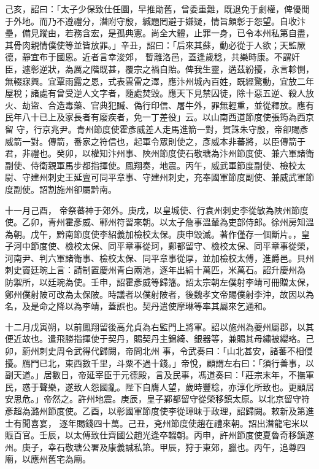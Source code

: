 \begin{pinyinscope}
 己亥，詔曰：「太子少保致仕任圜，早推勛舊，曾委重難，既退免于劇權，俾優閒于外地。而乃不遵禮分，潛附守殷，緘題罔避于嫌疑，情旨頗彰于怨望。自收汴壘，備見蹤由，若務含宏，是孤典憲。尚全大體，止罪一身，已令本州私第自盡，其骨肉親情僕使等並皆放罪。」辛丑，詔曰：「后來其蘇，動必從于人欲；天監厥德，靜宜布于國恩。近者言幸浚郊，
 暫離洛邑，蓋逢歲稔，共樂時康。不謂奸臣，遽彰逆狀，為厲之階既甚，覆宗之禍自貽。俾我生靈，遘茲紛擾，永言軫惻，無輟寐興。宜覃雨露之恩，式表雲雷之澤，應汴州城內百姓，既經驚動，宜放二年屋稅；諸處有曾受逆人文字者，隨處焚毀。應天下見禁囚徒，除十惡五逆、殺人放火、劫盜、合造毒藥、官典犯贓、偽行印信、屠牛外，罪無輕重，並從釋放。應有民年八十已上及家長者有廢疾者，免一丁差役」云。以山南西道節度使張筠為西京留
 守，行京兆尹。青州節度使霍彥威差人走馬進箭一對，賀誅朱守殷，帝卻賜彥威箭一對。傳箭，番家之符信也，起軍令眾則使之，彥威本非蕃將，以臣傳箭于君，非禮也。癸卯，以權知汴州事、陜州節度使石敬瑭為汴州節度使、兼六軍諸衛副使、侍衛親軍馬步都指揮使。鳳翔奏，地震。丙午，威武軍節度副使、檢校太尉、守建州刺史王延亶可同平章事、守建州刺史，充奉國軍節度副使、兼威武軍節度副使。詔割施州卻屬黔南。



 十一月己酉，
 帝祭蕃神于郊外。庚戌，以皇城使、行袁州刺史李從敏為陜州節度使。乙卯，青州霍彥威、鄆州符習來朝。以太子詹事溫輦為吏部侍郎。徐州房知溫為朝。戊午，黔南節度使李紹義加檢校太保。庚申毀滅。著作僅存一個斷片。，皇子河中節度使、檢校太保、同平章事從珂，鄴都留守、檢校太保、同平章事從榮，河南尹、判六軍諸衛事、檢校太保、同平章事從厚，並加檢校太傅，進爵邑。貝州刺史竇廷琬上言：請制置慶州青白兩池，逐年出絹十萬匹，米萬石。詔升慶州為
 防禦所，以廷琬為使。壬申，詔霍彥威等歸籓。詔太宗朝左僕射李靖可冊贈太保，鄭州僕射陂可改為太保陂。時議者以僕射陂者，後魏孝文帝賜僕射李沖，故因以為名，及是命之降以為李靖，蓋誤也。契丹遣使摩琳等率其屬來乞通和。



 十二月戊寅朔，以前鳳翔留後高允貞為右監門上將軍。詔以施州為夔州屬郡，以其便近故也。遣飛勝指揮使于契丹，賜契丹主錦綺、銀器等，兼賜其母繡被纓珞。己卯，蔚州刺史周令武得代歸闕，帝問北州
 事，令武奏曰：「山北甚安，諸蕃不相侵擾。鴈門已北，東西數千里，斗粟不過十錢。」帝悅，顧謂左右曰：「須行善事，以副天道。」居數日，帝延宰臣于元德殿，言及民事，馮道奏曰：「莊宗末年，不撫軍民，惑于聲樂，遂致人怨國亂。陛下自膺人望，歲時豐稔，亦淳化所致也。更顧居安思危。」帝然之。許州地震。庚辰，皇子鄴都留守從榮移鎮太原。以北京留守符彥超為潞州節度使。乙酉，以彰國軍節度使李從璋昧于政理，詔歸闕。敕新及第進士有聞喜宴，
 逐年賜錢四十萬。己丑，兗州節度使趙在禮來朝。詔出潛龍宅米以賑百官。壬辰，以太傅致仕齊國公趙光逢卒輟朝。丙申，許州節度使夏魯奇移鎮遂州。庚子，幸石敬瑭公署及康義誠私第。甲辰，狩于東郊，臘也。丙午，追尊四廟，以應州舊宅為廟。



\end{pinyinscope}